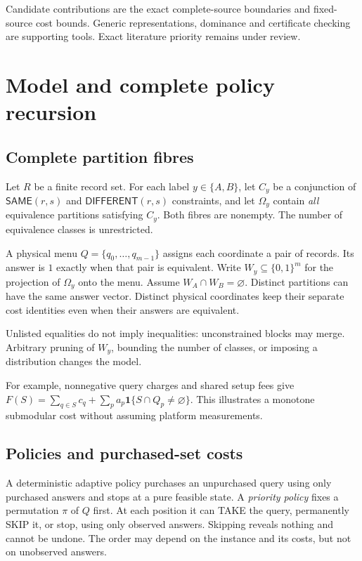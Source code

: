 \documentclass[pdflatex,sn-mathphys-num]{sn-jnl}
\newcommand{\SAME}{\mathsf{SAME}}
\newcommand{\DIFF}{\mathsf{DIFFERENT}}
\theoremstyle{thmstyleone}
\theoremstyle{thmstylethree}
\theoremstyle{thmstyletwo}
\begin{document}
Candidate contributions are the exact complete-source boundaries and fixed-source cost bounds. Generic representations, dominance and certificate checking are supporting tools. Exact literature priority remains under review.


\section{Model and complete policy recursion}
\subsection{Complete partition fibres}
Let $R$ be a finite record set. For each label $y\in\{A,B\}$, let $C_y$ be a conjunction of $\SAME(r,s)$ and $\DIFF(r,s)$ constraints, and let $\Omega_y$ contain \emph{all} equivalence partitions satisfying $C_y$. Both fibres are nonempty. The number of equivalence classes is unrestricted.

A physical menu $Q=\{q_0,\ldots,q_{m-1}\}$ assigns each coordinate a pair of records. Its answer is $1$ exactly when that pair is equivalent. Write $W_y\subseteq\{0,1\}^m$ for the projection of $\Omega_y$ onto the menu. Assume $W_A\cap W_B=\varnothing$. Distinct partitions can have the same answer vector. Distinct physical coordinates keep their separate cost identities even when their answers are equivalent.

Unlisted equalities do not imply inequalities: unconstrained blocks may merge. Arbitrary pruning of $W_y$, bounding the number of classes, or imposing a distribution changes the model.

For example, nonnegative query charges and shared setup fees give
$F(S)=\sum_{q\in S}c_q+\sum_p a_p\mathbf1\{S\cap Q_p\ne\varnothing\}$.
This illustrates a monotone submodular cost without assuming platform measurements.

\subsection{Policies and purchased-set costs}
A deterministic adaptive policy purchases an unpurchased query using only purchased answers and stops at a pure feasible state. A \emph{priority policy} fixes a permutation $\pi$ of $Q$ first. At each position it can TAKE the query, permanently SKIP it, or stop, using only observed answers. Skipping reveals nothing and cannot be undone. The order may depend on the instance and its costs, but not on unobserved answers.
\end{document}
